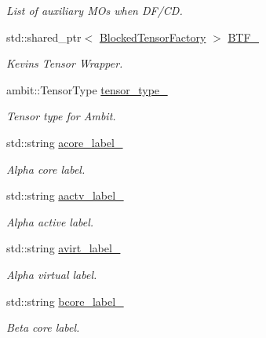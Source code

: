\begin{DoxyCompactItemize}
\begin{DoxyCompactList}\small\item\em List of auxiliary M\+Os when D\+F/\+CD. \end{DoxyCompactList}\item 
std\+::shared\+\_\+ptr$<$ \mbox{\hyperlink{classforte_1_1_blocked_tensor_factory}{Blocked\+Tensor\+Factory}} $>$ \mbox{\hyperlink{classforte_1_1_m_a_s_t_e_r___d_s_r_g_a09420e1b82fa41e79a056b649263f24f}{B\+T\+F\+\_\+}}
\begin{DoxyCompactList}\small\item\em Kevin\textquotesingle{}s Tensor Wrapper. \end{DoxyCompactList}\item 
ambit\+::\+Tensor\+Type \mbox{\hyperlink{classforte_1_1_m_a_s_t_e_r___d_s_r_g_a60a2868b36ff504600d54d3439e164a9}{tensor\+\_\+type\+\_\+}}
\begin{DoxyCompactList}\small\item\em Tensor type for Ambit. \end{DoxyCompactList}\item 
std\+::string \mbox{\hyperlink{classforte_1_1_m_a_s_t_e_r___d_s_r_g_abff106d8594df55eb66453af3776437a}{acore\+\_\+label\+\_\+}}
\begin{DoxyCompactList}\small\item\em Alpha core label. \end{DoxyCompactList}\item 
std\+::string \mbox{\hyperlink{classforte_1_1_m_a_s_t_e_r___d_s_r_g_adce2f2826088afd266078226106c9e64}{aactv\+\_\+label\+\_\+}}
\begin{DoxyCompactList}\small\item\em Alpha active label. \end{DoxyCompactList}\item 
std\+::string \mbox{\hyperlink{classforte_1_1_m_a_s_t_e_r___d_s_r_g_aaecc8034cf8ab6060a96d4518cea4d94}{avirt\+\_\+label\+\_\+}}
\begin{DoxyCompactList}\small\item\em Alpha virtual label. \end{DoxyCompactList}\item 
std\+::string \mbox{\hyperlink{classforte_1_1_m_a_s_t_e_r___d_s_r_g_a95fa3c21a55bff5a1fe9343a9994b923}{bcore\+\_\+label\+\_\+}}
\begin{DoxyCompactList}\small\item\em Beta core label. \end{DoxyCompactList}\item 

\end{DoxyCompactItemize}
